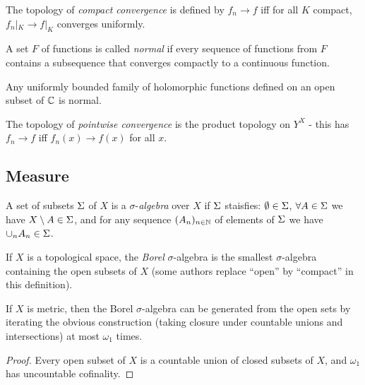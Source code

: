 \documentclass[letterpaper,11pt]{report}
\begin{document}
\begin{defn} The topology of \emph{compact convergence} is defined by $f_n \rightarrow f$ iff for all $K$ compact, $f_n|_K \rightarrow f|_K$ converges uniformly.
\end{defn}

\begin{prop} A set $F$ of functions is called \emph{normal} if every sequence of functions from $F$ contains a subsequence that converges compactly to a continuous function.
\end{prop}

\begin{thm}[Montel] Any uniformly bounded family of holomorphic functions defined on an open subset of $\mathbb{C}$ is normal.
\end{thm}

\begin{defn} The topology of \emph{pointwise convergence} is the product topology on $Y^X$ - this has $f_n \rightarrow f$ iff $f_n(x) \rightarrow f(x)$ for all $x$.
\end{defn}


\subsection{Measure}

\begin{defn} A set of subsets $\Sigma$ of $X$ is a $\sigma$-\emph{algebra} over $X$ if $\Sigma$ staisfies: $\emptyset \in \Sigma$, $\forall A \in \Sigma$ we have $X\setminus A \in \Sigma$, and for any sequence $(A_n)_{n \in \mathbb{N}}$ of elements of $\Sigma$ we have $\cup_n A_n \in \Sigma$.
\end{defn}

\begin{defn} If $X$ is a topological space, the \emph{Borel} $\sigma$-algebra is the smallest $\sigma$-algebra containing the open subsets of $X$ (some authors replace ``open'' by ``compact'' in this definition).
\end{defn}

\begin{prop} If $X$ is metric, then the Borel $\sigma$-algebra can be generated from the open sets by iterating the obvious construction (taking closure under countable unions and intersections) at most $\omega_1$ times.
\end{prop}
\begin{proof} Every open subset of $X$ is a countable union of closed subsets of $X$, and $\omega_1$ has uncountable cofinality.
\end{proof}
\end{document}
